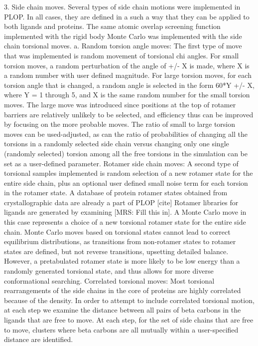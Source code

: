 3.
Side chain moves.
Several types of side chain motions were implemented in PLOP.
In all cases, they are defined in a such a way that they can be applied to both ligands and proteins.
The same atomic overlap screening function implemented with the rigid body Monte Carlo was implemented with the side chain torsional moves.
a.
Random torsion angle moves: The first type of move that was implemented is random movement of torsional chi angles.
For small torsion moves, a random perturbation of the angle of +/- X is made, where X is a random number with user defined magnitude.
For large torsion moves, for each torsion angle that is changed, a random angle is selected in the form 60*Y +/- X, where Y = 1 through 5, and X is the same random number for the small torsion moves.
The large move was introduced since positions at the top of rotamer barriers are relatively unlikely to be selected, and efficiency thus can be improved by focusing on the more probable moves.
The ratio of small to large torsion moves can be used-adjusted, as can the ratio of probabilities of changing all the torsions in a randomly selected side chain versus changing only one single (randomly selected) torsion among all the free torsions in the simulation can be set as a user-defined parameter.
Rotamer side chain moves: A second type of torsional samples implemented is random selection of a new rotamer state for the entire side chain, plus an optional user defined small noise term for each torsion in the rotamer state.
A database of protein rotamer states obtained from crystallographic data are already a part of PLOP [cite] Rotamer libraries for ligands are generated by examining [MRS: Fill this in].
A Monte Carlo move in this case represents a choice of a new torsional rotamer state for the entire side chain.
Monte Carlo moves based on torsional states cannot lead to correct equilibrium distributions, as transitions from non-rotamer states to rotamer states are defined, but not reverse transitions, upsetting detailed balance.
However, a pretabulated rotamer state is more likely to be low energy than a randomly generated torsional state, and thus allows for more diverse conformational searching.
Correlated torsional moves: Most torsional rearrangements of the side chains in the core of proteins are highly correlated because of the density.
In order to attempt to include correlated torsional motion, at each step we examine the distance between all pairs of beta carbons in the ligands that are free to move.
At each step, for the set of side chains that are free to move, clusters where beta carbons are all mutually within a user-specified distance are identified.
